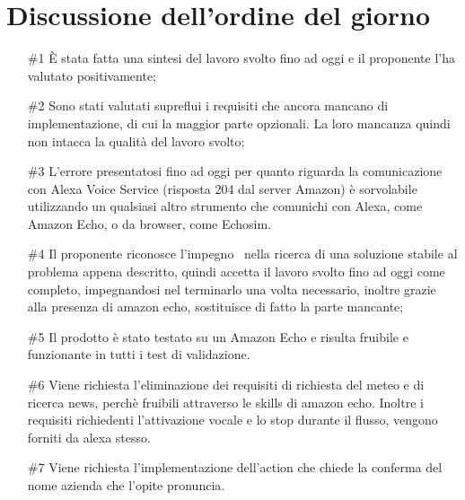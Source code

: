 \documentclass[../verbale-2017-05-10.tex]{subfiles}
\begin{document}
	\section{Discussione dell'ordine del giorno}
	\begin{itemize}
		\item [\#1] È stata fatta una sintesi del lavoro svolto fino ad oggi e il proponente l'ha valutato positivamente;
		\item [\#2] Sono stati valutati supreflui i requisiti che ancora mancano di implementazione, di cui la maggior parte opzionali. La loro mancanza quindi non intacca la qualità del lavoro svolto;
		\item [\#3] L'errore presentatosi fino ad oggi per quanto riguarda la comunicazione con Alexa Voice Service (risposta 204 dal server Amazon) è sorvolabile utilizzando un qualsiasi altro strumento 
		che comunichi con Alexa, come Amazon Echo, o da browser, come Echosim.
		\item [\#4] Il proponente riconosce l'impegno \kpanic\ nella ricerca di una soluzione stabile al problema appena descritto, quindi accetta il lavoro svolto fino ad oggi come completo, impegnandosi nel terminarlo una volta necessario, inoltre grazie alla presenza di amazon echo, sostituisce di fatto la parte mancante;
		\item [\#5] Il prodotto è stato testato su un Amazon Echo e risulta fruibile e funzionante in tutti i test di validazione.
		\item[\#6] Viene richiesta l'eliminazione dei requisiti di richiesta del meteo e di ricerca news, perchè fruibili attraverso le skills di amazon echo.  Inoltre i requisiti richiedenti l'attivazione vocale e lo stop durante il flusso, vengono forniti da alexa stesso.
		\item[\#7] Viene richiesta l'implementazione dell'action che chiede la conferma del nome azienda che l'opite pronuncia.
	\end{itemize}
\end{document}

